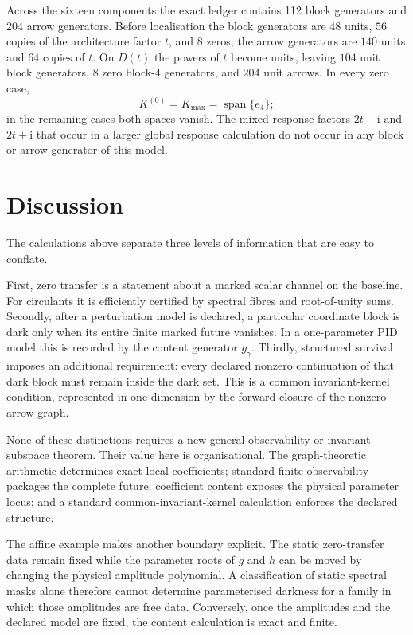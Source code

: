\documentclass[11pt]{article}
\theoremstyle{definition}
\theoremstyle{remark}
\DeclareMathOperator{\spanop}{span}
\newcommand{\Kzero}{K^{(0)}}
\newcommand{\Kmax}{K_{\max}}
\newcommand{\ii}{\mathrm{i}}
\begin{document}
Across the sixteen components the exact ledger contains 112 block generators and 204 arrow generators. Before localisation the block generators are $48$ units, $56$ copies of the architecture factor $t$, and $8$ zeros; the arrow generators are $140$ units and $64$ copies of $t$. On $D(t)$ the powers of $t$ become units, leaving $104$ unit block generators, $8$ zero block-$4$ generators, and $204$ unit arrows. In every zero case,
\[
\Kzero=\Kmax=\spanop\{e_4\};
\]
in the remaining cases both spaces vanish. The mixed response factors $2t-\ii$ and $2t+\ii$ that occur in a larger global response calculation do not occur in any block or arrow generator of this model.

\section{Discussion}\label{sec:discussion}

The calculations above separate three levels of information that are easy to conflate.

First, zero transfer is a statement about a marked scalar channel on the baseline. For circulants it is efficiently certified by spectral fibres and root-of-unity sums. Secondly, after a perturbation model is declared, a particular coordinate block is dark only when its entire finite marked future vanishes. In a one-parameter PID model this is recorded by the content generator $g_\gamma$. Thirdly, structured survival imposes an additional requirement: every declared nonzero continuation of that dark block must remain inside the dark set. This is a common invariant-kernel condition, represented in one dimension by the forward closure of the nonzero-arrow graph.

None of these distinctions requires a new general observability or invariant-subspace theorem. Their value here is organisational. The graph-theoretic arithmetic determines exact local coefficients; standard finite observability packages the complete future; coefficient content exposes the physical parameter locus; and a standard common-invariant-kernel calculation enforces the declared structure.

The affine example makes another boundary explicit. The static zero-transfer data remain fixed while the parameter roots of $g$ and $h$ can be moved by changing the physical amplitude polynomial. A classification of static spectral masks alone therefore cannot determine parameterised darkness for a family in which those amplitudes are free data. Conversely, once the amplitudes and the declared model are fixed, the content calculation is exact and finite.
\end{document}
